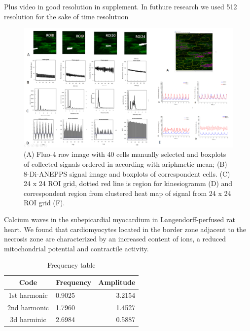 \documentclass{biophys-new}
\begin{document}
Plus video in good resolution in supplement. In futhure research we used 512 resolution for the sake of time resolutuon


\begin{figure}
    \includegraphics[width=0.9\linewidth]{fig3.png}
    \caption{(A) Fluo-4 raw image with 40 cells manually selected and  boxplots of collected signals ordered in according with ariphmetic mean; (B) 8-Di-ANEPPS signal image and boxplots of correspondent cells. (C) 24 x 24 ROI grid, dotted red line is region for kinesiogramm (D) and correspondent region from clustered heat map of signal from 24 x 24 ROI grid (F).}
    \label{fig:fig3}
\end{figure}

Calcium waves in the subepicardial myocardium in Langendorff-perfused rat heart.
We found that cardiomyocytes located in the border zone adjacent to the necrosis zone are characterized by an increased content of  ions, a reduced mitochondrial potential and contractile activity.


\begin{table}[hbt!]
\caption{Frequency table}
\label{tab:freq}
\centering
\begin{threeparttable}
\begin{tabular}{c l r}
\hline
Code & Frequency & Amplitude  \\\hline
1st harmonic & 0.9025 & 3.2154 \\
2nd harmonic & 1.7960 & 1.4527  \\
3d harminic & 2.6984 & 0.5887    \\
\hline
\end{tabular}
\begin{tablenotes}
\end{tablenotes}
\end{threeparttable}
\end{table}
\end{document}
